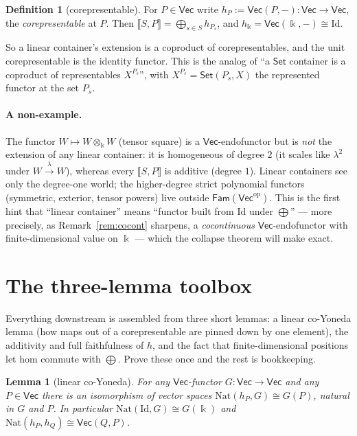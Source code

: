 \documentclass[11pt]{amsart}
\theoremstyle{plain}
\newtheorem{lemma}[theorem]{Lemma}
\theoremstyle{definition}
\newtheorem{definition}[theorem]{Definition}
\renewcommand{\Vec}{\mathsf{Vec}}
\newcommand{\Set}{\mathsf{Set}}
\newcommand{\Fam}{\mathsf{Fam}}
\newcommand{\op}{\mathrm{op}}
\newcommand{\Nat}{\mathrm{Nat}}
\newcommand{\Id}{\mathrm{Id}}
\newcommand{\ext}[1]{\llbracket #1 \rrbracket}
\newcommand{\fld}{\Bbbk}
\newcommand{\bul}{{-}}
\newcommand{\iso}{\cong}
\begin{document}
\begin{definition}[corepresentable]\label{def:corep}
For $P\in\Vec$ write $h_P := \Vec(P,\bul)\colon\Vec\to\Vec$, the
\emph{corepresentable} at $P$. Then $\ext{S,P}=\bigoplus_{s\in S} h_{P_s}$, and
$h_\fld = \Vec(\fld,\bul)\iso\Id$.
\end{definition}

So a linear container's extension is a coproduct of corepresentables, and the
unit corepresentable is the identity functor. This is the analog of ``a $\Set$
container is a coproduct of representables $X^{P_s}$'', with $X^{P_s}=
\Set(P_s,X)$ the represented functor at the set $P_s$.

\paragraph{A non-example.}
The functor $W\mapsto W\otimes_\fld W$ (tensor square) is a $\Vec$-endofunctor
but is \emph{not} the extension of any linear container: it is homogeneous of
degree $2$ (it scales like $\lambda^2$ under $W\xrightarrow{\lambda} W$),
whereas every $\ext{S,P}$ is additive (degree $1$). Linear containers see only
the degree-one world; the higher-degree strict polynomial functors
(symmetric, exterior, tensor powers) live outside $\Fam(\Vec^\op)$. This is the
first hint that ``linear container'' means ``functor built from $\Id$ under
$\bigoplus$'' --- more precisely, as Remark~\ref{rem:cocont} sharpens, a
\emph{cocontinuous} $\Vec$-endofunctor with finite-dimensional value on $\fld$
--- which the collapse theorem will make exact.

\section{The three-lemma toolbox}\label{sec:lemmas}

Everything downstream is assembled from three short lemmas: a linear co-Yoneda
lemma (how maps out of a corepresentable are pinned down by one element), the
additivity and full faithfulness of $h$, and the fact that finite-dimensional
positions let hom commute with $\bigoplus$. Prove these once and the rest is
bookkeeping.

\begin{lemma}[linear co-Yoneda]\label{lem:coyoneda}
For any $\Vec$-functor $G\colon\Vec\to\Vec$ and any $P\in\Vec$ there is an
isomorphism of vector spaces $\Nat(h_P,G)\iso G(P)$, natural in $G$ and $P$. In
particular $\Nat(\Id,G)\iso G(\fld)$ and $\Nat(h_P,h_Q)\iso\Vec(Q,P)$.
\end{lemma}
\end{document}
